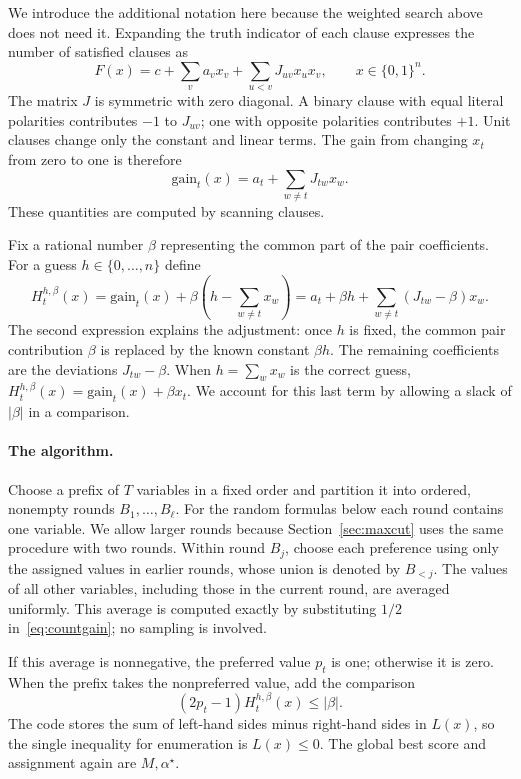\documentclass[11pt,a4paper]{article}
\theoremstyle{definition}
\theoremstyle{remark}
\newcommand{\bits}{\{0,1\}}
\begin{document}
We introduce the additional notation here because the weighted search
above does not need it. Expanding the truth indicator of each clause
expresses the number of satisfied clauses as
\begin{equation}
 F(x)=c+\sum_v a_vx_v+\sum_{u<v}J_{uv}x_ux_v,
 \qquad x\in\bits^n.
 \label{eq:quadratic}
\end{equation}
The matrix $J$ is symmetric with zero diagonal.
A binary clause with equal literal polarities contributes $-1$ to
$J_{uv}$; one with opposite polarities contributes $+1$.
Unit clauses change only the constant and linear terms.
The gain from changing $x_t$ from zero to one is therefore
\[
 \mathrm{gain}_t(x)=a_t+\sum_{w\ne t}J_{tw}x_w.
\]
These quantities are computed by scanning clauses.

Fix a rational number $\beta$ representing the common part of the pair
coefficients. For a guess $h\in\{0,\ldots,n\}$ define
\begin{equation}
 H_t^{h,\beta}(x)=\mathrm{gain}_t(x)
          +\beta\left(h-\sum_{w\ne t}x_w\right)
       =a_t+\beta h+\sum_{w\ne t}(J_{tw}-\beta)x_w.
 \label{eq:countgain}
\end{equation}
The second expression explains the adjustment: once $h$ is fixed, the
common pair contribution $\beta$ is replaced by the known constant
$\beta h$. The remaining coefficients are the deviations $J_{tw}-\beta$.
When $h=\sum_wx_w$ is the correct guess,
$H_t^{h,\beta}(x)=\mathrm{gain}_t(x)+\beta x_t$.
We account for this last term by allowing a slack of $|\beta|$ in a
comparison.

\paragraph{The algorithm.}
Choose a prefix of $T$ variables in a fixed order and partition it into
ordered, nonempty rounds $B_1,\ldots,B_\ell$.
For the random formulas below each round contains one variable.
We allow larger rounds because Section~\ref{sec:maxcut} uses the same
procedure with two rounds.
Within round $B_j$, choose each preference using only the assigned values
in earlier rounds, whose union is denoted by $B_{<j}$.
The values of all other variables, including those in the current round,
are averaged uniformly. This average is computed exactly by substituting
$1/2$ in~\eqref{eq:countgain}; no sampling is involved.

If this average is nonnegative, the preferred value $p_t$ is one;
otherwise it is zero. When the prefix takes the nonpreferred value,
add the comparison
\[
 (2p_t-1)H_t^{h,\beta}(x)\le|\beta|.
\]
The code stores the sum of left-hand sides minus right-hand sides in
$L(x)$, so the single inequality for enumeration is $L(x)\le0$.
The global best score and assignment again are $M,\alpha^\star$.
\end{document}
